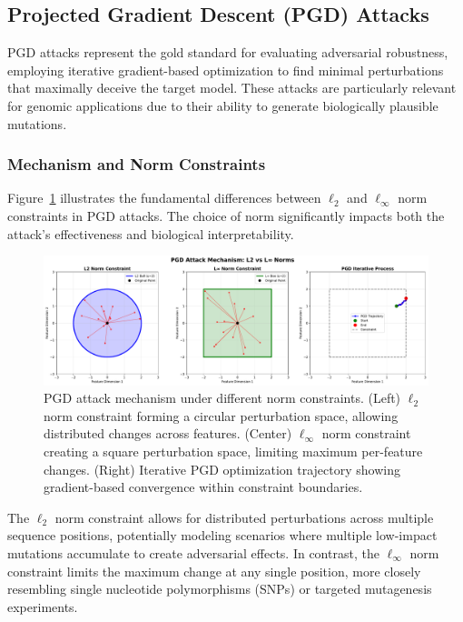\documentclass{article} %
\begin{document}
\subsection{Projected Gradient Descent (PGD) Attacks}

PGD attacks represent the gold standard for evaluating adversarial robustness, employing iterative gradient-based optimization to find minimal perturbations that maximally deceive the target model. These attacks are particularly relevant for genomic applications due to their ability to generate biologically plausible mutations.

\subsubsection{Mechanism and Norm Constraints}

Figure~\ref{fig:pgd_mechanism} illustrates the fundamental differences between $\ell_2$ and $\ell_\infty$ norm constraints in PGD attacks. The choice of norm significantly impacts both the attack's effectiveness and biological interpretability.

\begin{figure}[h]
\centering
\includegraphics[width=\textwidth]{figures/pgd_mechanism_diagram.pdf}
\caption{PGD attack mechanism under different norm constraints. (Left) $\ell_2$ norm constraint forming a circular perturbation space, allowing distributed changes across features. (Center) $\ell_\infty$ norm constraint creating a square perturbation space, limiting maximum per-feature changes. (Right) Iterative PGD optimization trajectory showing gradient-based convergence within constraint boundaries.}
\label{fig:pgd_mechanism}
\end{figure}

The $\ell_2$ norm constraint allows for distributed perturbations across multiple sequence positions, potentially modeling scenarios where multiple low-impact mutations accumulate to create adversarial effects. In contrast, the $\ell_\infty$ norm constraint limits the maximum change at any single position, more closely resembling single nucleotide polymorphisms (SNPs) or targeted mutagenesis experiments.
\end{document}
